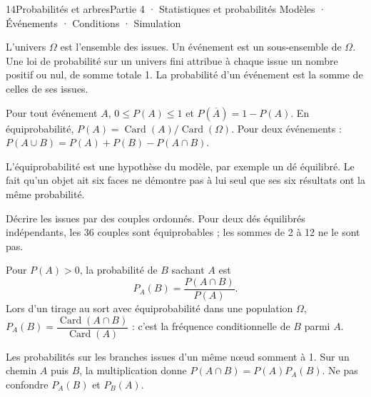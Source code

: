 \begin{ouverture}[probabilites]{14}{Probabilités et arbres}{Partie 4 · Statistiques et probabilités}
{Modèles · Événements · Conditions · Simulation}
\end{ouverture}
\pagestyle{otMain}\essentiel\fontsize{11}{15}\selectfont
{}
\begin{definition}L’univers $\Omega$ est l’ensemble des issues. Un événement est un sous-ensemble de $\Omega$. Une loi de probabilité sur un univers fini attribue à chaque issue un nombre positif ou nul, de somme totale 1. La probabilité d’un événement est la somme de celles de ses issues.\end{definition}
\begin{propriete}Pour tout événement $A$, $0\le P(A)\le1$ et $P(\overline A)=1-P(A)$. En équiprobabilité, $P(A)=\operatorname{Card}(A)/\operatorname{Card}(\Omega)$. Pour deux événements : $P(A\cup B)=P(A)+P(B)-P(A\cap B)$.\end{propriete}
\begin{attention}L’équiprobabilité est une hypothèse du modèle, par exemple un dé équilibré. Le fait qu’un objet ait six faces ne démontre pas à lui seul que ses six résultats ont la même probabilité.\end{attention}
\begin{savoirfaire}Décrire les issues par des couples ordonnés. Pour deux dés équilibrés indépendants, les 36 couples sont équiprobables ; les sommes de 2 à 12 ne le sont pas.\end{savoirfaire}
\clearpage
{}
\begin{definition}Pour $P(A)>0$, la probabilité de $B$ sachant $A$ est
\[P_A(B)=\frac{P(A\cap B)}{P(A)}.\]
Lors d’un tirage au sort avec équiprobabilité dans une population $\Omega$, $P_A(B)=\dfrac{\operatorname{Card}(A\cap B)}{\operatorname{Card}(A)}$ : c’est la fréquence conditionnelle de $B$ parmi $A$.
\end{definition}
\begin{propriete}Les probabilités sur les branches issues d’un même nœud somment à 1. Sur un chemin $A$ puis $B$, la multiplication donne $P(A\cap B)=P(A)P_A(B)$. Ne pas confondre $P_A(B)$ et $P_B(A)$.\end{propriete}
